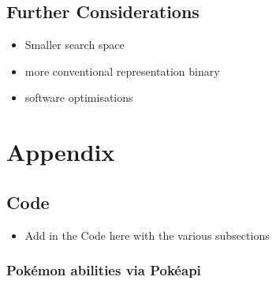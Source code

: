 \documentclass[a4paper]{article}
\newcommand{\Pokemon}{Pok\'{e}mon}
\newcommand{\Pokeapi}{Pok\'{e}api}
\begin{document}
\subsection{Further Considerations}
\par
\begin{itemize}
	\item Smaller search space
	\item more conventional representation binary
	\item software optimisations
\end{itemize}

\pagebreak
\section{Appendix}
\subsection{Code}
\begin{itemize}
	\item Add in the Code here with the various subsections
\end{itemize}
\subsubsection{\Pokemon{} abilities via \Pokeapi{}}

\end{document}
